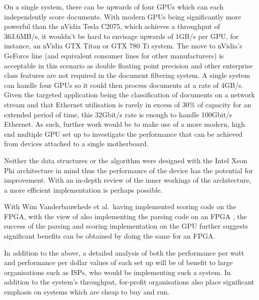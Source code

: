 On a single system, there can be upwards of four GPUs which can each
independently score documents. With modern GPUs being significantly more
powerful than the nVidia Tesla C2075, which achieves a throughput of 363.6MB/s,
it wouldn't be hard to envisage upwards of 1GB/s per GPU, for instance, an
nVidia GTX Titan or GTX 780 Ti system. The move to nVidia's GeForce line (and
equivalent consumer lines for other manufacturers) is acceptable in this
scenario as double floating point precision and other enterprise class features
are not required in the document filtering system. A single system can handle
four GPUs so it could then process documents at a rate of 4GB/s. Given the
targeted application being the classification of documents on a network stream
and that Ethernet utilisation is rarely in excess of 30\% of capacity for an
extended period of time, this 32Gbit/s rate is enough to handle 100Gbit/s
Ethernet. As such, further work would be to make use of a more modern, high end
multiple GPU set up to investigate the performance that can be achieved from
devices attached to a single motherboard.

Neither the data structures or the algorithm were designed with the Intel Xeon
Phi architecture in mind thus the performance of the device has the potential
for improvement. With an in-depth review of the inner workings of the
architecture, a more efficient implementation is perhaps possible.

With Wim Vanderbauwhede et al.\ having implemented scoring code on the FPGA,
with the view of also implementing the parsing code on an FPGA
\cite{HybridCPUFPGA}, the success of the parsing and scoring implementation on
the GPU further suggests significant benefits can be obtained by doing the same
for an FPGA.

In addition to the above, a detailed analysis of both the performance per watt
and performance per dollar values of each set up will be of benefit to large
organisations such as ISPs, who would be implementing such a system. In addition
to the system's throughput, for-profit organisations also place significant
emphasis on systems which are cheap to buy and run.
